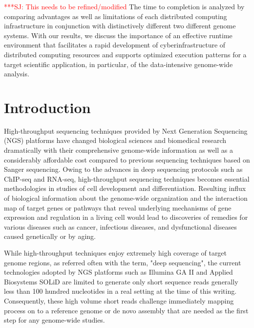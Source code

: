 \documentclass[12pt]{article}
\newcommand{\jhanote}[1]{ {\textcolor{red}     {***SJ: #1}}}
\newcommand{\jhanote}[1]{}
\begin{document}


\jhanote{This needs to be refined/modified} The time to completion is analyzed by comparing advantages as well as limitations of each distributed computing infrastructure in conjunction with distinctively different two different genome systems.  With our results, we discuss the importance of an effective runtime environment that facilitates a rapid development of cyberinfrastructure of distributed computing resources and supports optimized execution patterns for a target scientific application, in particular, of the data-intensive genome-wide analysis.


\section{Introduction}

% 
% 
High-throughput sequencing techniques provided by Next Generation Sequencing (NGS) platforms have changed biological
sciences and biomedical research dramatically with their comprehensive genome-wide
information as well as a considerably affordable cost compared to previous sequencing techniques based on Sanger sequencing\cite{metzker2010,mardis2008-tig,mardis2008-arghg,gilad2009,mortazavi2008,sorek2010}.  
Owing to the advances in deep sequencing protocols such as ChIP-seq and RNA-seq, high-throughput sequencing techniques becomes essential methodologies in studies of cell development and differentiation\cite{wang2009-natrevgen,pepke2009,gilad2009,mortazavi2008,sorek2010}.   Resulting influx of biological information about the genome-wide organization and the interaction map of target genes or pathways that reveal underlying mechanisms of gene expression and regulation in a living cell would lead to discoveries of remedies for various diseases such as cancer, infectious diseases, and dysfunctional diseases caused genetically or by aging\cite{amaral2008,encode2007,baek2008,costa2009,}.    

While high-throughput techniques enjoy extremely high coverage of target genome regions, as referred often with the term, "deep sequencing", the current technologies adopted by NGS platforms such as Illumina GA II and Applied Biosystems SOLiD are limited to generate only short sequence reads generally less than 100 hundred nucleotides in a real setting at the time of this writing\cite{metzker2010}.  Consequently, these high volume short reads challenge immediately mapping process on to a reference genome or de novo assembly that are needed as the first step for any genome-wide studies\cite{alex2009,trapnell2009,scheibye-alsing2009,pop2002,hernandez2008,farrer2008}.
\end{document}

